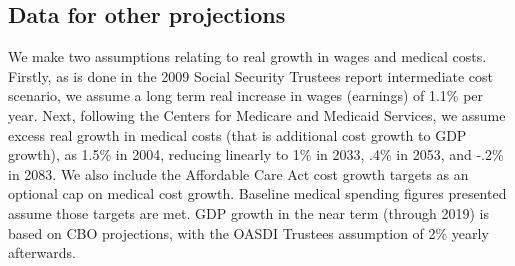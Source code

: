 \subsection{Data for other projections}
We make two assumptions relating to real growth in wages and medical costs. Firstly, as is done in the 2009 
Social Security Trustees report intermediate cost scenario, we assume a long term real increase in wages 
(earnings) of 1.1\% per year. Next, following the Centers for Medicare and Medicaid Services, we assume 
excess real growth in medical costs (that is additional cost growth to GDP growth), as 1.5\% in 2004, 
reducing linearly to 1\% in 2033, .4\% in 2053, and -.2\% in 2083. We also include the Affordable Care 
Act cost growth targets as an optional cap on medical cost growth. Baseline medical spending figures 
presented assume those targets are met. GDP growth in the near term (through 2019) is based on CBO 
projections, with the OASDI Trustees assumption of 2\% yearly afterwards.

